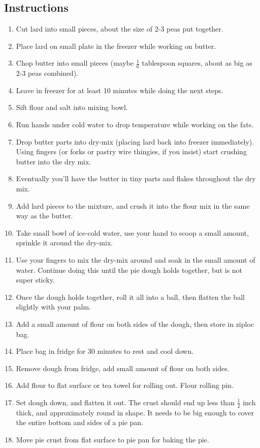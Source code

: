 \begin{multicols}{2}
\subsection*{Instructions}
\begin{enumerate}
    \item Cut lard into small pieces, about the size of 2-3 peas put together.
    \item Place lard on small plate in the freezer while working on butter.
    \item Chop butter into small pieces (maybe \( \frac{1}{6} \) tablespoon squares, about as big as 2-3 peas combined).
    \item Leave in freezer for at least 10 minutes while doing the next steps.
    \item Sift flour and salt into mixing bowl.
    \item Run hands under cold water to drop temperature while working on the fats.
    \item Drop butter parts into dry-mix (placing lard back into freezer immediately). Using fingers (or forks or pastry wire thingies, if you insist) start crushing butter into the dry mix.
    \item Eventually you’ll have the butter in tiny parts and flakes throughout the dry mix.
    \item Add lard pieces to the mixture, and crush it into the flour mix in the same way as the butter.
    \item Take small bowl of ice-cold water, use your hand to scoop a small amount, sprinkle it around the dry-mix.
    \item Use your fingers to mix the dry-mix around and soak in the small amount of water. Continue doing this until the pie dough holds together, but is not super sticky.
    \item Once the dough holds together, roll it all into a ball, then flatten the ball slightly with your palm.
    \item Add a small amount of flour on both sides of the dough, then store in ziploc bag.
    \item Place bag in fridge for 30 minutes to rest and cool down.
    \item Remove dough from fridge, add small amount of flour on both sides.
    \item Add flour to flat surface or tea towel for rolling out. Flour rolling pin.
    \item Set dough down, and flatten it out. The crust should end up less than \( \frac{1}{2} \) inch thick, and approximately round in shape. It needs to be big enough to cover the entire bottom and sides of a pie pan.
    \item Move pie crust from flat surface to pie pan for baking the pie.


\end{enumerate}
\end{multicols}
